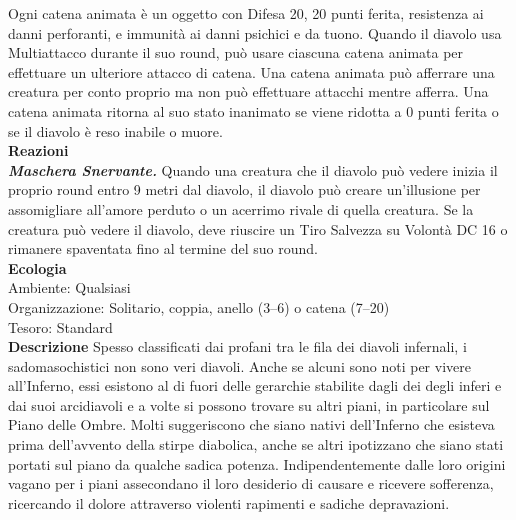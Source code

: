\begin{multicols}{2}
Ogni catena animata è un oggetto con Difesa 20, 20 punti ferita, resistenza ai danni perforanti, e immunità ai danni psichici e da tuono. Quando il diavolo usa Multiattacco durante il suo round, può usare ciascuna catena animata per effettuare un ulteriore attacco di catena. Una catena animata può afferrare una creatura per conto proprio ma non può effettuare attacchi mentre afferra. Una catena animata ritorna al suo stato inanimato se viene ridotta a 0 punti ferita o se il diavolo è reso inabile o muore.\\
\textbf{Reazioni}\\
\emph{\textbf{Maschera Snervante.}} Quando una creatura che il diavolo può vedere inizia il proprio round entro 9 metri dal diavolo, il diavolo può creare un'illusione per assomigliare all'amore perduto o un acerrimo rivale di quella creatura. Se la creatura può vedere il diavolo, deve riuscire un Tiro Salvezza su Volontà DC  16 o rimanere spaventata fino al termine del suo round.\\
\textbf{Ecologia}\\
Ambiente: Qualsiasi\\
Organizzazione: Solitario, coppia, anello (3–6) o catena (7–20)\\
Tesoro: Standard\\
\textbf{Descrizione}
Spesso classificati dai profani tra le fila dei diavoli infernali, i sadomasochistici non sono veri diavoli. Anche se alcuni sono noti per vivere all'Inferno, essi esistono al di fuori delle gerarchie stabilite dagli dei degli inferi e dai suoi arcidiavoli e a volte si possono trovare su altri piani, in particolare sul Piano delle Ombre. Molti suggeriscono che siano nativi dell'Inferno che esisteva prima dell'avvento della stirpe diabolica, anche se altri ipotizzano che siano stati portati sul piano da qualche sadica potenza. Indipendentemente dalle loro origini vagano per i piani assecondano il loro desiderio di causare e ricevere sofferenza, ricercando il dolore attraverso violenti rapimenti e sadiche depravazioni.\\


\end{multicols}
